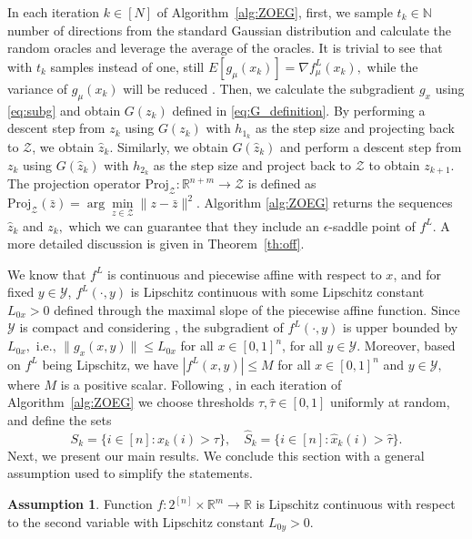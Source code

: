 \documentclass{article}
\theoremstyle{plain}
\theoremstyle{definition}
\newtheorem{assumption}[theorem]{Assumption}
\theoremstyle{remark}
\newcommand{\R}{\mathbb{R}}
\newcommand{\N}{\mathbb{N}}
\begin{document}
In each iteration $k\in [N]$ %
of Algorithm~\ref{alg:ZOEG}, first, we sample $t_k \in \N$ number of directions from the standard Gaussian distribution and calculate the random oracles and leverage the average of the oracles. It is trivial to see that with $t_k$ %
samples instead of one, still $E[g_\mu(x_k)] = \nabla f^L_\mu(x_k),$ while the variance of $g_\mu(x_k)$ will be reduced \cite{farzin2025minmax}. Then, we calculate the subgradient $g_x$ using \eqref{eq:subg} and obtain $G(z_k)$ defined in \eqref{eq:G_definition}. By performing
a descent step from $z_k$ using $G(z_k)$ with $h_{1_k}$ as the step size and projecting back to $\mathcal{Z}$, we obtain $\hat{z}_k$. 
Similarly, we obtain $G(\hat{z}_k)$ and perform
a descent step from $z_k$ using $G(\hat{z}_k)$ with $h_{2_k}$ as the step size and project back to $\mathcal{Z}$ to obtain $z_{k+1}.$ %
The projection operator
$\mathrm{Proj}_{\mathcal{Z}}:\R^{n+m} \rightarrow \mathcal{Z}$ is defined as
\(
\mathrm{Proj}_{\mathcal{Z}}(\bar{z}) = \arg\underset{z\in\mathcal{Z}}{\min} \|z-\bar{z}\|^2.
\)
Algorithm \ref{alg:ZOEG} returns the sequences $\hat{z}_k$ and $z_k,$ which we can guarantee that they include an $\epsilon$-saddle point of $f^L.$ A more
detailed discussion is given in Theorem~\ref{th:off}.


We know that $f^L$ is continuous and piecewise affine with respect to $x$, and for fixed $y\in \mathcal{Y}$, $f^L(\cdot,y)$ is Lipschitz continuous %
with some Lipschitz constant $L_{0x}>0$ defined through the maximal slope of the piecewise affine function. %
Since $\mathcal{Y}$ is compact and considering \citep[Thm.~24.7]{rockafellar2015convex}, the subgradient of $f^L(\cdot,y)$ %
is upper bounded by $L_{0x},$ i.e., $\|g_x(x,y)\|\leq L_{0x}$ for all $x\in[0,1]^n$, for all $y\in \mathcal{Y}$. Moreover, based on $f^L$ being Lipschitz, %
we have $|f^L(x,y)|\leq M$ for all $x\in[0,1]^n$ and $y\in\mathcal{Y},$ where $M$ is a positive scalar.
Following \cite{hazan2012online}, in each iteration of Algorithm~\ref{alg:ZOEG} we
choose thresholds $\tau,\hat{\tau}\in[0,1]$ uniformly at random, and define the sets 
\begin{equation}\label{eq:Sk}
    S_k\!=\!\{i\in[n]:x_k(i)>\tau\},\quad \hat{S}_k=\{i\in[n]:\hat{x}_k(i)>\hat{\tau}\}.
\end{equation}
Next, we present our main results. 
We conclude this section with a general assumption used to simplify the statements.
\begin{assumption}\label{assum:lipsch}
    Function $f: 2^{[n]}\times\mathbb{R}^m\to\mathbb{R}$ is Lipschitz continuous with respect to the second variable with Lipschitz constant $L_{0y}>0.$
\end{assumption}
\end{document}
